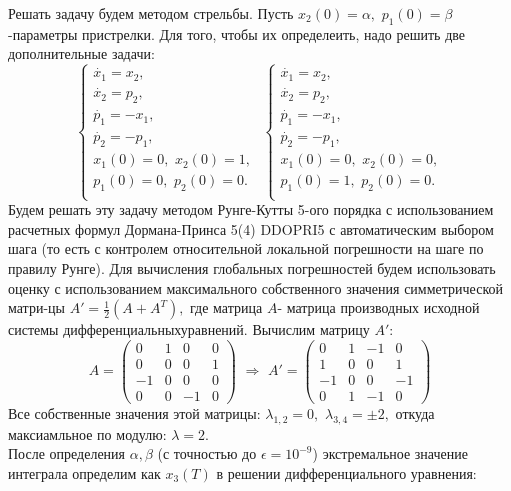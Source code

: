 \documentclass{article}
\theoremstyle{remark}
\theoremstyle{definition}
\begin{document}
 Решать задачу будем методом стрельбы. Пусть $x_2(0)=\alpha,\,\,p_1(0)=\beta$ -параметры пристрелки. Для того, чтобы их определеить, надо решить две дополнительные задачи:
 $$
\begin{cases}
  \dot{x_1}=x_2,\\
  \dot{x_2}=p_2,\\
  \dot{p_1}=-x_1,\\
  \dot{p_2}=-p_1,\\
  x_1(0)=0,\,\,x_2(0)=1,\\
  p_1(0)=0,\,\,p_2(0)=0.\\
 \end{cases}  \,\,
\begin{cases}
  \dot{x_1}=x_2,\\
  \dot{x_2}=p_2,\\
  \dot{p_1}=-x_1,\\
  \dot{p_2}=-p_1,\\
  x_1(0)=0,\,\,x_2(0)=0,\\
  p_1(0)=1,\,\,p_2(0)=0.\\
 \end{cases} $$
Будем решать эту задачу методом Рунге-Кутты 5-ого порядка с использованием расчетных формул Дормана-Принса 5(4) DDOPRI5 с автоматическим выбором шага (то есть с контролем относительной локальной погрешности на шаге по правилу Рунге). Для вычисления глобальных погрешностей будем использовать оценку с использованием максимального собственного значения симметрической матри-цы $A'=\frac 1 2(A+A^T),$ где матрица $A$- матрица производных исходной системы дифференциальныхуравнений. Вычислим матрицу $A'$:
$$
A=
\begin{pmatrix}
  0 & 1 & 0 & 0\\
  0 & 0 & 0 & 1\\
  -1 & 0 & 0 & 0\\
  0 & 0 & -1 & 0
\end{pmatrix}\,\,\Rightarrow\,\,
A'=
\begin{pmatrix}
  0 & 1 & -1 & 0\\
  1 & 0 & 0 & 1\\
  -1 & 0 & 0 & -1\\
  0 & 1 & -1 & 0
\end{pmatrix}
$$
Все собственные значения этой матрицы: $\lambda_{1,2}=0,\,\,\lambda_{3,4}=\pm2,$ откуда максиамльное по модулю: $\lambda=2.$\\
После определения $\alpha,\beta$ (с точностью до $\epsilon=10^{-9}$) экстремальное значение интеграла определим как $x_3(T)$ в решении дифференциального уравнения:
\end{document}
